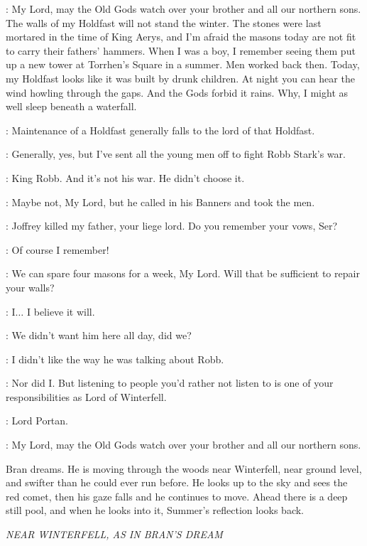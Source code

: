 \NORTHERNLORD: My Lord, may the Old Gods watch over your brother and all our northern sons. The walls of my Holdfast will not stand the winter. The stones were last mortared in the time of King Aerys, and I'm afraid the masons today are not fit to carry their fathers' hammers. When I was a boy, I remember seeing them put up a new tower at Torrhen's Square in a summer. Men worked back then. Today, my Holdfast looks like it was built by drunk children. At night you can hear the wind howling through the gaps. And the Gods forbid it rains. Why, I might as well sleep beneath a waterfall.

\LUWIN: Maintenance of a Holdfast generally falls to the lord of that Holdfast.

\NORTHERNLORD: Generally, yes, but I've sent all the young men off to fight Robb Stark's war.

\BRAN: King Robb. And it's not his war. He didn't choose it.

\NORTHERNLORD: Maybe not, My Lord, but he called in his Banners and took the men.

\BRAN: Joffrey killed my father, your liege lord. Do you remember your vows, Ser?

\NORTHERNLORD: Of course I remember!

\LUWIN: We can spare four masons for a week, My Lord. Will that be sufficient to repair your walls?

\NORTHERNLORD: I$\ldots$ I believe it will.


\LUWIN: We didn't want him here all day, did we?

\BRAN: I didn't like the way he was talking about Robb.

\LUWIN: Nor did I. But listening to people you'd rather not listen to is one of your responsibilities as Lord of Winterfell.

\HERALD: Lord Portan.

\PORTAN: My Lord, may the Old Gods watch over your brother and all our northern sons.


\scene

\n Bran dreams. He is moving through the woods near Winterfell, near ground level, and swifter than he could ever run before. He looks up to the sky and sees the red comet, then his gaze falls and he continues to move. Ahead there is a deep still pool, and when he looks into it, Summer's reflection looks back.

\scene

\textit{NEAR WINTERFELL, AS IN BRAN'S DREAM}

